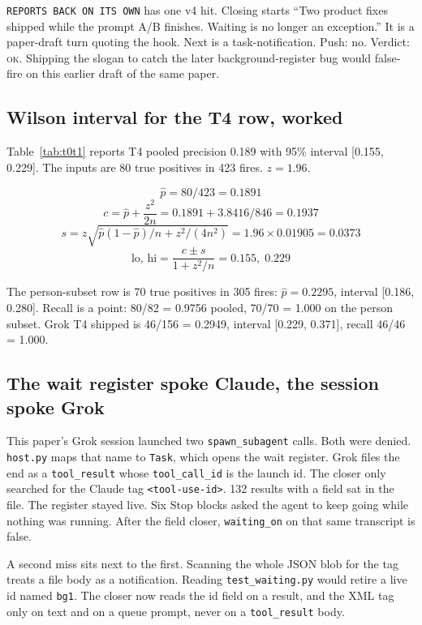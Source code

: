 \texttt{REPORTS BACK ON ITS OWN} has one v4 hit. Closing starts
``Two product fixes shipped while the prompt A/B finishes.
Waiting is no longer an exception.'' It is a paper-draft turn
quoting the hook. Next is a task-notification. Push: no. Verdict:
\textsc{ok}. Shipping the slogan to catch the later
background-register bug would false-fire on this earlier draft of
the same paper.




\subsection{Wilson interval for the T4 row, worked}
\label{app:t4wilson}

Table~\ref{tab:t0t1} reports T4 pooled precision 0.189 with 95\%
interval [0.155, 0.229]. The inputs are 80 true positives in 423
fires. $z=1.96$.

\[
\hat p = 80/423 = 0.1891
\]
\[
c = \hat p + \frac{z^2}{2n} = 0.1891 + 3.8416/846 = 0.1937
\]
\[
s = z\sqrt{\hat p(1-\hat p)/n + z^2/(4n^2)} = 1.96 \times 0.01905 = 0.0373
\]
\[
\mathrm{lo},\,\mathrm{hi} = \frac{c \pm s}{1 + z^2/n} = 0.155,\; 0.229
\]

The person-subset row is 70 true positives in 305 fires:
$\hat p = 0.2295$, interval [0.186, 0.280]. Recall is a point:
80/82 = 0.9756 pooled, 70/70 = 1.000 on the person subset. Grok T4
shipped is 46/156 = 0.2949, interval [0.229, 0.371], recall 46/46
= 1.000.

\subsection{The wait register spoke Claude, the session spoke Grok}
\label{app:waitdialect}

This paper's Grok session launched two \texttt{spawn\_subagent} calls.
Both were denied. \texttt{host.py} maps that name to \texttt{Task},
which opens the wait register. Grok files the end as a
\texttt{tool\_result} whose \texttt{tool\_call\_id} is the launch id.
The closer only searched for the Claude tag
\texttt{<tool-use-id>}. 132 results with a field sat in the file. The
register stayed live. Six Stop blocks asked the agent to keep going
while nothing was running. After the field closer,
\texttt{waiting\_on} on that same transcript is false.

A second miss sits next to the first. Scanning the whole JSON blob
for the tag treats a file body as a notification. Reading
\texttt{test\_waiting.py} would retire a live id named \texttt{bg1}.
The closer now reads the id field on a result, and the XML tag only
on text and on a queue prompt, never on a \texttt{tool\_result}
body.

